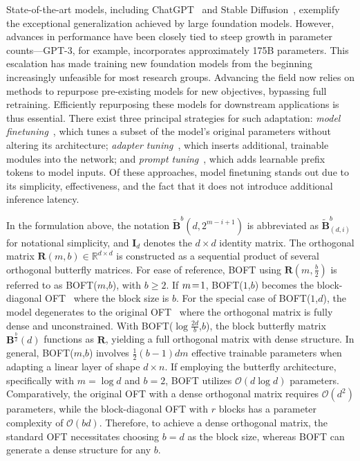State-of-the-art models, including ChatGPT~\cite{brown2020language,chen2021evaluating} and Stable Diffusion~\cite{rombach2022high}, exemplify the exceptional generalization achieved by large foundation models. However, advances in performance have been closely tied to steep growth in parameter counts—GPT-3, for example, incorporates approximately 175B parameters. This escalation has made training new foundation models from the beginning increasingly unfeasible for most research groups. Advancing the field now relies on methods to repurpose pre-existing models for new objectives, bypassing full retraining. Efficiently repurposing these models for downstream applications is thus essential. There exist three principal strategies for such adaptation: \emph{model finetuning}~\cite{hulora2022,zaken2022bitfit,guo2020parameter,raffel2020exploring,qiu2023controlling,zhang2022adaptive,chavan2023one}, which tunes a subset of the model's original parameters without altering its architecture; \emph{adapter tuning}~\cite{rebuffi2017learning,houlsby2019parameter,pfeiffer2020adapterfusion,lin2020exploring,he2021towards}, which inserts additional, trainable modules into the network; and \emph{prompt tuning}~\cite{li2021prefix,lester2021power}, which adds learnable prefix tokens to model inputs. Of these approaches, model finetuning stands out due to its simplicity, effectiveness, and the fact that it does not introduce additional inference latency.

In the formulation above, the notation $\tilde{\bm{B}}^b(d,2^{m - i+1})$ is abbreviated as $\tilde{\bm{B}}^b_{(d,i)}$ for notational simplicity, and $\bm{I}_d$ denotes the $d \times d$ identity matrix. The orthogonal matrix $\bm{R}(m,b)\in\mathbb{R}^{d\times d}$ is constructed as a sequential product of several orthogonal butterfly matrices. For ease of reference, BOFT using $\bm{R}(m,\frac{b}{2})$ is referred to as BOFT($m$,$b$), with $b\geq 2$. If $\thickmuskip=2mu \medmuskip=2mu m=1$, BOFT($1$,$b$) becomes the block-diagonal OFT~\cite{qiu2023controlling} where the block size is $b$. For the special case of BOFT($1$,$d$), the model degenerates to the original OFT~\cite{qiu2023controlling} where the orthogonal matrix is fully dense and unconstrained. With BOFT($\log \frac{2d}{b}$,$b$), the block butterfly matrix $\bm{B}^{\frac{b}{2}}(d)$ functions as $\bm{R}$, yielding a full orthogonal matrix with dense structure. In general, BOFT($m$,$b$) involves $\frac{1}{2}(b-1)dm$ effective trainable parameters when adapting a linear layer of shape $d\times n$. If employing the butterfly architecture, specifically with $m=\log d$ and $b=2$, BOFT utilizes $\mathcal{O}(d\log d)$ parameters. Comparatively, the original OFT with a dense orthogonal matrix requires $\mathcal{O}(d^2)$ parameters, while the block-diagonal OFT with $r$ blocks has a parameter complexity of $\mathcal{O}(bd)$. Therefore, to achieve a dense orthogonal matrix, the standard OFT necessitates choosing $b=d$ as the block size, whereas BOFT can generate a dense structure for any $b$.

